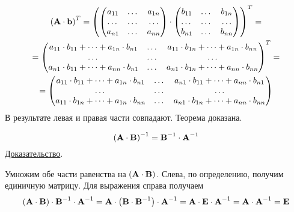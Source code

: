\documentclass[../../calc-math-exam-2023.tex]{subfiles}
\begin{document}
\begin{theorem}
\begin{gather*}
            \left( \bf{A} \cdot \bf{b} \right)^T =
            \left(
            \begin{pmatrix}
                a_{11} & \dots & a_{1n} \\
                \dots  & \dots & \dots  \\
                a_{n1} & \dots & a_{nn}
            \end{pmatrix}
            \cdot
            \begin{pmatrix}
                b_{11} & \dots & b_{1n} \\
                \dots  & \dots & \dots  \\
                b_{n1} & \dots & b_{nn}
            \end{pmatrix}
            \right)^T
            = \\
            = \begin{pmatrix}
                  a_{11} \cdot b_{11} + \dots + a_{1n} \cdot b_{n1} & \dots & a_{11} \cdot b_{1n} + \dots + a_{1n} \cdot b_{nn} \\
                  \dots                                             & \dots & \dots                                             \\
                  a_{n1} \cdot b_{11} + \dots + a_{nn} \cdot b_{n1} & \dots & a_{n1} \cdot b_{1n} + \dots + a_{nn} \cdot b_{nn}
            \end{pmatrix}^T = \\
            = \begin{pmatrix}
                  a_{11} \cdot b_{11} + \dots + a_{1n} \cdot b_{n1} & \dots & a_{n1} \cdot b_{11} + \dots + a_{nn} \cdot b_{n1} \\
                  \dots                                             & \dots & \dots                                             \\
                  a_{11} \cdot b_{1n} + \dots + a_{1n} \cdot b_{nn} & \dots & a_{n1} \cdot b_{1n} + \dots + a_{nn} \cdot b_{nn}
            \end{pmatrix}
        \end{gather*}
        В результате левая и правая части совпадают. Теорема доказана.
    \end{theorem}

    \begin{theorem}
        \begin{equation*}
            \left( \bf{A} \cdot \bf{B} \right)^{-1} = \bf{B}^{-1} \cdot \bf{A}^{-1}
        \end{equation*}
        \underline{Доказательство}.

        Умножим обе части равенства на $\left( \bf{A} \cdot \bf{B} \right)$. Слева, по определению,
        получим единичную матрицу. Для выражения справа получаем
        \begin{equation*}
            \left( \bf{A} \cdot \bf{B} \right) \cdot \bf{B}^{-1} \cdot \bf{A}^{-1} = \bf{A} \cdot \left( \bf{B} \cdot \bf{B}^{-1} \right) \cdot \bf{A}^{-1} =
            \bf{A} \cdot \bf{E} \cdot \bf{A}^{-1} = \bf{A} \cdot \bf{A}^{-1} = \bf{E}
        \end{equation*}
    \end{theorem}
\end{document}
